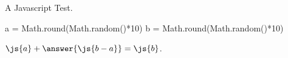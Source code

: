 \documentclass{ximera}
\author{Jim Fowler \and Bart Snapp}
\begin{document}
A Javascript Test. 

\begin{javascript}
a = Math.round(Math.random()*10)
b = Math.round(Math.random()*10)
\end{javascript}

\begin{problem}
  $\js{a} + \answer{\js{b-a}} = \js{b}$.
\end{problem}
\end{document}
